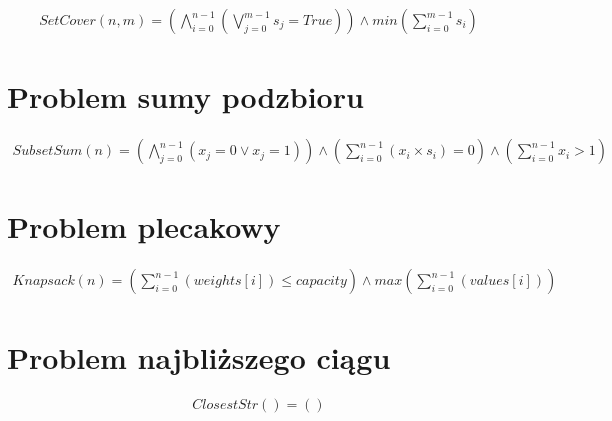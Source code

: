 \begin{align*}
	SetCover(n, m) = \left( \bigwedge_{i=0}^{n-1} (\bigvee_{j=0}^{m-1} s_j = True) \right) \land 
	min \left( \sum_{i=0}^{m-1} s_i \right) 
\end{align*}

\section{Problem sumy podzbioru}

\begin{align*}
	SubsetSum(n) = \left( \bigwedge_{j=0}^{n-1} (x_j = 0 \lor x_j = 1) \right) \land 
	\left( \sum_{i=0}^{n-1} (x_i \times s_i) = 0 \right) \land 
	\left( \sum_{i=0}^{n-1} x_i > 1 \right)
\end{align*}

\section{Problem plecakowy}

\begin{align*}
	Knapsack(n) = \left( \sum_{i=0}^{n-1} (weights[i]) \leq capacity \right) \land 
	max \left( \sum_{i=0}^{n-1} (values[i]) \right)
\end{align*}

\section{Problem najbliższego ciągu}

\begin{align*}
	ClosestStr() = \left(  \right) 
\end{align*}

